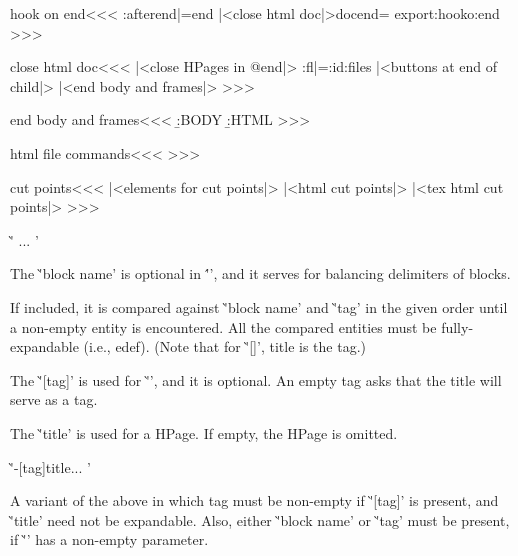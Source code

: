 {{\<hook on end\><<<
\def\at:docend{|<close html doc|>\global\let\at:docend=\empty}
\expand:after{\let\o:end|=}\csname end\endcsname
\expandafter\def\csname end\endcsname{\HtmlEnv
   \at:docend
   \csname export:hook\endcsname   \csname o:end\endcsname}
>>>


\<close html doc\><<<
|<close HPages in @end|>%
\HAssign\op:fl|=\maxfile:id\space  \close:files  
|<buttons at end of child|>%
|<end body and frames|>%
>>>



\<end body and frames\><<<
{\b:BODY \b:HTML}%
>>>


\<html file commands\><<<
\def\close:files{%
   \ifnum \op:fl<\bs:fileid \else
      \def\:warning##1{}%
      \EndFileStream{\RefFileNumber\op:fl}%
      \Advance:\op:fl |by -1
      \expandafter\close:files
   \fi}
>>>





\<cut points\><<<
|<elements for cut points|>
\ifHtml  |<html cut points|>
       |<tex html cut points|>
\fi
>>>



\`' ... '

\List{$\button$}

\item The \`'block name' is optional in \''\EndHPage', and it serves
for balancing delimiters of blocks.   

If included, it is compared against \`'block name' and \`'tag'
in the given order until a non-empty entity is encountered. 
All the compared entities must be fully-expandable (i.e., edef).
(Note that for \`'[]', title is the tag.)

\item The \`'[tag]' is used for \`'\RefFile', and it is optional. 
An empty tag asks that the title will serve as a tag.

\item The \`'{title}' is used for a HPage. If empty, the HPage is omitted.

\EndList

\`'-[tag]title\ContHPage ... '

A variant of the above in which tag must be non-empty if \`'[tag]' is
present, and \`'title' need not be expandable. Also, either \`'block
name' or \`'tag' must be present, if \`'' has a
non-empty parameter.


}}
